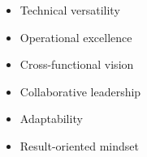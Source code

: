 %
%
%

\twocolumnsection
{
\begin{skills}
\end{skills}}
{
\vspace{1em}
\begin{itemize}
	\item Technical versatility
	\item Operational excellence
    \item Cross-functional vision
    \item Collaborative leadership
    \item Adaptability
    \item Result-oriented mindset
\end{itemize}
}

